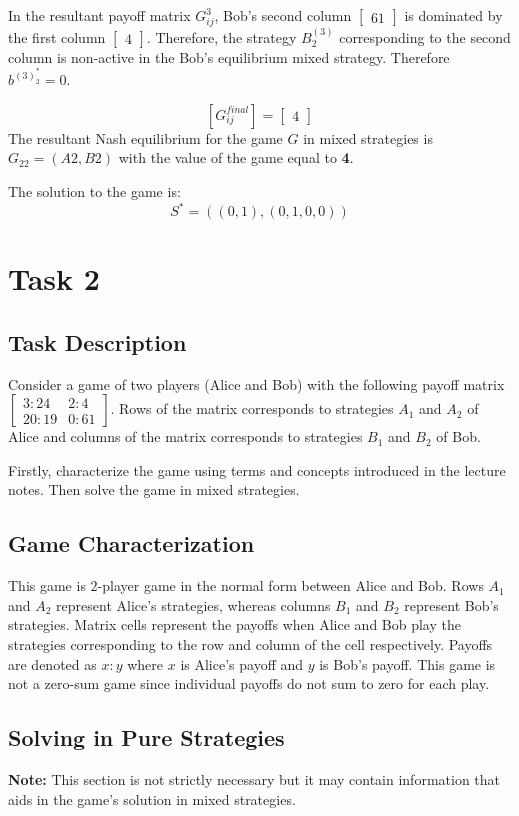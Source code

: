 \documentclass{article}
\begin{document}
In the resultant payoff matrix $G^3_{ij}$, Bob's second column $\begin{bmatrix} 61 \end{bmatrix}$ is dominated by the first column $\begin{bmatrix} 4 \end{bmatrix}$. 
Therefore, the strategy $B^{(3)}_2$ corresponding to the second column is non-active in the Bob's equilibrium mixed strategy. Therefore $b^{(3)}^*_2=0$.

$$
[G^{final}_{ij}] = 
\begin{bmatrix}
4 
\end{bmatrix}
$$
The resultant Nash equilibrium for the game $G$ in mixed strategies is $G_{22} = (A2, B2)$  with the value of the game equal to \textbf{4}.

The solution to the game is:
$$
S^* = ((0, 1),(0, 1, 0, 0))
$$
\section{Task 2}
\subsection{Task Description}
Consider a game of two players (Alice and Bob) with the following payoff matrix $
\begin{bmatrix}
3:24 & 2:4 \\
20:19 & 0:61
\end{bmatrix}
$. Rows of the matrix corresponds to strategies $A_1$ and $A_2$ of Alice and columns of the matrix corresponds to strategies $B_1$ and $B_2$ of Bob. 

Firstly, characterize the game using terms and concepts introduced in the lecture notes. Then
solve the game in mixed strategies.
\subsection{Game Characterization}
This game is $2$-player game in the normal form between Alice and Bob. Rows $A_1$ and $A_2$ represent  Alice's strategies, whereas columns $B_1$ and $B_2$ represent Bob's strategies. Matrix cells represent the payoffs when Alice and Bob play the strategies corresponding to the row and column of the cell respectively. Payoffs are denoted as $x : y$ where $x$ is Alice’s payoff and $y$ is Bob’s payoff.
This game is not a zero-sum game since individual payoffs do not sum to zero for each
play.

\subsection{Solving in Pure Strategies}
\textbf{Note:} This section is not strictly necessary 
but it may contain information that aids 
in the game's solution in mixed strategies. \\
\end{document}
